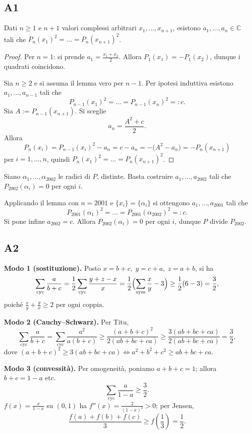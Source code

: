 \documentclass[11pt]{scrartcl}
\begin{document}
\subsection{A1}
\begin{lemma*}
Dati $n\geq 1$ e $n+1$ valori complessi arbitrari $x_1,\dots,x_{n+1}$, esistono $a_1,\dots,a_n\in\mathbb{C}$ tali che $P_n(x_1)^2=\dots=P_n(x_{n+1})^2$.
\end{lemma*}

\begin{proof}
Per $n=1$: si prende $a_1=\frac{x_1+x_2}{2}$. Allora $P_1(x_1)=-P_1(x_2)$, dunque i quadrati coincidono.

Sia $n\geq 2$ e si assuma il lemma vero per $n-1$. Per ipotesi induttiva esistono $a_1,\dots,a_{n-1}$ tali che
$$
P_{n-1}(x_1)^2=\dots=P_{n-1}(x_n)^2=:c.
$$
Sia $A:=P_{n-1}(x_{n+1})$. Si sceglie
$$
a_n=\frac{A^2+c}{2}.
$$
Allora
$$
P_n(x_i)=P_{n-1}(x_i)^2-a_n=c-a_n=-\bigl(A^2-a_n\bigr)=-P_n(x_{n+1})
$$
per $i=1,\dots,n$, quindi $P_n(x_1)^2=\dots=P_n(x_{n+1})^2$.
\end{proof}

Siano $\alpha_1,\dots,\alpha_{2002}$ le radici di $P$, distinte. Basta costruire $a_1,\dots,a_{2002}$ tali che $P_{2002}(\alpha_i)=0$ per ogni $i$.

Applicando il lemma con $n=2001$ e $\{x_i\}=\{\alpha_i\}$ si ottengono $a_1,\dots,a_{2001}$ tali che
$$
P_{2001}(\alpha_1)^2=\dots=P_{2001}(\alpha_{2002})^2=:c.
$$
Si pone infine $a_{2002}=c$. Allora $P_{2002}(\alpha_i)=0$ per ogni $i$, dunque $P$ divide $P_{2002}$.



\subsection{A2}
\textbf{Modo 1 (sostituzione).} Posto $x=b+c,\;y=c+a,\;z=a+b$, si ha
$$
\sum_{\text{cyc}}\frac{a}{b+c}=\frac12\sum_{\text{cyc}}\frac{y+z-x}{x}
=\frac12\Bigl(\sum_{\text{sym}}\frac{x}{y}-3\Bigr)\ge\frac12(6-3)=\frac32,
$$
poich\'e $\frac{x}{y}+\frac{y}{x}\ge2$ per ogni coppia.

\textbf{Modo 2 (Cauchy--Schwarz).} Per Titu,
$$
\sum_{\text{cyc}}\frac{a}{b+c}=\sum_{\text{cyc}}\frac{a^2}{a(b+c)}
\ge\frac{(a+b+c)^2}{2(ab+bc+ca)}\ge\frac{3(ab+bc+ca)}{2(ab+bc+ca)}=\frac32,

$$
dove $(a+b+c)^2\ge3(ab+bc+ca)\iff a^2+b^2+c^2\ge ab+bc+ca$.

\textbf{Modo 3 (convessit\`a).} Per omogeneit\`a, poniamo $a+b+c=1$; allora $b+c=1-a$ etc.
$$
\sum_{\text{cyc}}\frac{a}{1-a}\ge\frac32.
$$
$f(x)=\frac{x}{1-x}$ su $(0,1)$ ha $f''(x)=\frac{2}{(1-x)^3}>0$; per Jensen,
$$
\frac{f(a)+f(b)+f(c)}{3}\ge f\!\left(\frac13\right)=\frac12.
$$
\end{document}

